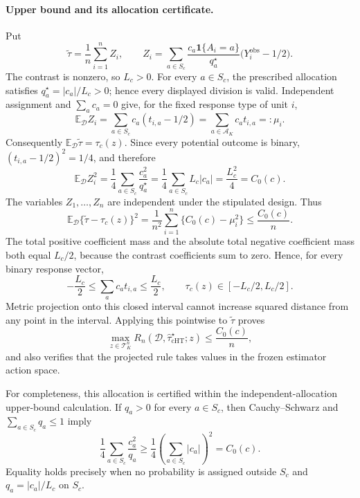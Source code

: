 \paragraph{Upper bound and its allocation certificate.}
Put
\[
 \widetilde\tau=\frac1n\sum_{i=1}^n Z_i,
 \qquad
 Z_i=\sum_{a\in S_c}\frac{c_a\mathbf 1\{A_i=a\}}{q_a^\star}
 \bigl(Y_i^{\mathrm{obs}}-1/2\bigr).
\]
The contrast is nonzero, so \(L_c>0\).  For every \(a\in S_c\), the prescribed allocation satisfies
\(q_a^\star=|c_a|/L_c>0\); hence every displayed division is valid.  Independent assignment and
\(\sum_a c_a=0\) give, for the fixed response type of unit \(i\),
\[
 \mathbb E_{\mathcal D}Z_i
 =\sum_{a\in S_c}c_a(t_{i,a}-1/2)
 =\sum_{a\in\mathcal A_K}c_at_{i,a}=:\mu_i.
\]
Consequently \(\mathbb E_{\mathcal D}\widetilde\tau=\tau_c(z)\).  Since every potential outcome is binary,
\((t_{i,a}-1/2)^2=1/4\), and therefore
\[
 \mathbb E_{\mathcal D}Z_i^2
 =\frac14\sum_{a\in S_c}\frac{c_a^2}{q_a^\star}
 =\frac14\sum_{a\in S_c}L_c|c_a|
 =\frac{L_c^2}{4}=C_0(c).
\]
The variables \(Z_1,\ldots,Z_n\) are independent under the stipulated design.  Thus
\[
 \mathbb E_{\mathcal D}\{\widetilde\tau-\tau_c(z)\}^2
 =\frac1{n^2}\sum_{i=1}^n\{C_0(c)-\mu_i^2\}
 \leq \frac{C_0(c)}n.
\]
The total positive coefficient mass and the absolute total negative coefficient mass both equal
\(L_c/2\), because the contrast coefficients sum to zero.  Hence, for every binary response vector,
\[
 -\frac{L_c}{2}\leq\sum_a c_at_{i,a}\leq\frac{L_c}{2},
 \qquad
 \tau_c(z)\in[-L_c/2,L_c/2].
\]
Metric projection onto this closed interval cannot increase squared distance from any point in the
interval.  Applying this pointwise to \(\widetilde\tau\) proves
\[
 \max_{z\in\mathcal T_K^n}
 R_n(\mathcal D,\widehat\tau_{\mathrm{cHT}}^\star;z)
 \leq \frac{C_0(c)}n,
\]
and also verifies that the projected rule takes values in the frozen estimator action space.

For completeness, this allocation is certified within the independent-allocation upper-bound
calculation.  If \(q_a>0\) for every \(a\in S_c\), then Cauchy--Schwarz and
\(\sum_{a\in S_c}q_a\leq1\) imply
\[
 \frac14\sum_{a\in S_c}\frac{c_a^2}{q_a}
 \geq\frac14\left(\sum_{a\in S_c}|c_a|\right)^2=C_0(c).
\]
Equality holds precisely when no probability is assigned outside \(S_c\) and
\(q_a=|c_a|/L_c\) on \(S_c\).

